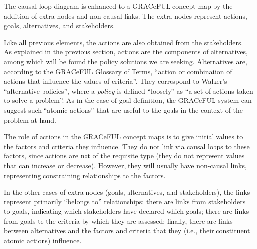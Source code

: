 The causal loop diagram is enhanced to a GRACeFUL concept map by the
addition of extra nodes and non-causal links. The extra nodes represent
actions, goals, alternatives, and stakeholders.

Like all previous elements, the actions are also obtained from the
stakeholders. As explained in the previous section, actions are the
components of alternatives, among which will be found the policy
solutions we are seeking. Alternatives are, according to the GRACeFUL
Glossary of Terms, ``action or combination of actions that influence the
values of criteria''. They correspond to Walker's ``alternative
policies'', where a \emph{policy} is defined ``loosely'' as ``a set of
actions taken to solve a problem''. As in the case of goal definition,
the GRACeFUL system can suggest such ``atomic actions'' that are useful
to the goals in the context of the problem at hand.

The role of actions in the GRACeFUL concept maps is to give initial
values to the factors and criteria they influence. They do not link via
causal loops to these factors, since actions are not of the requisite
type (they do not represent values that can increase or decrease).
However, they will usually have non-causal links, representing
constraining relationships to the factors.

In the other cases of extra nodes (goals, alternatives, and
stakeholders), the links represent primarily ``belongs to''
relationships: there are links from stakeholders to goals, indicating
which stakeholders have declared which goals; there are links from goals
to the criteria by which they are assessed; finally, there are links
between alternatives and the factors and criteria that they (i.e., their
constituent atomic actions) influence.
